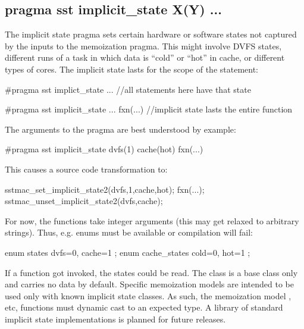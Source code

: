 \subsection{pragma sst implicit\_state X(Y) ...}\label{subsec:implicitStates}
The implicit state pragma sets certain hardware or software states not captured by the inputs to the memoization pragma.
This might involve DVFS states, different runs of a task in which data is ``cold'' or ``hot'' in cache, or different types of cores.
The implicit state lasts for the scope of the statement:

\begin{CppCode}
#pragma sst implict_state ...
{
 //all statements here have that state
}

#pragma sst implicit_state ...
fxn(...) //implicit state lasts the entire function
\end{CppCode}

The arguments to the pragma are best understood by example:

\begin{CppCode}
#pragma sst implicit_state dvfs(1) cache(hot)
fxn(...)
\end{CppCode}
This causes a source code transformation to:

\begin{CppCode}
sstmac_set_implicit_state2(dvfs,1,cache,hot);
fxn(...);
sstmac_unset_implicit_state2(dvfs,cache);
\end{CppCode}
For now, the functions take integer arguments (this may get relaxed to arbitrary strings).
Thus, e.g. enums must be available or compilation will fail:

\begin{CppCode}
enum states {
 dvfs=0,
 cache=1
};
enum cache_states {
 cold=0,
 hot=1
};
\end{CppCode}

If a  function got invoked, the states could be read.
The class  is a base class only and carries no data by default.
Specific memoization models are intended to be used only with known implicit state classes.
As such, the memoization model , etc, functions must dynamic cast to an expected type.
A library of standard implicit state implementations is planned for future releases.
